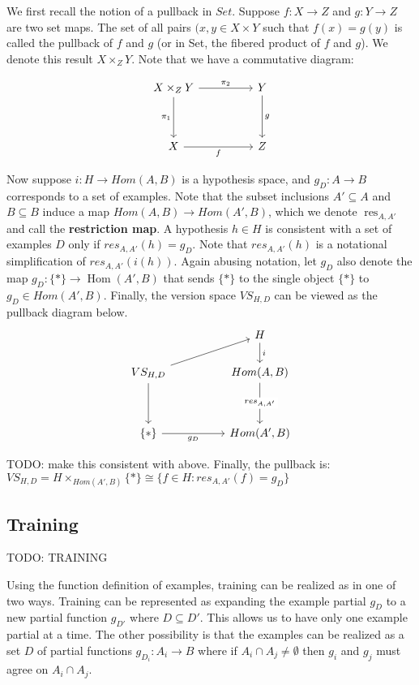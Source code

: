 \documentclass{article}
\theoremstyle{definition}
\begin{document}
We first recall the notion of a pullback in $Set$. Suppose $f:X\rightarrow Z$ and $g:Y\rightarrow Z$ are two set maps. The set of all pairs $(x,y \in X \times Y$ such that $f(x) = g(y)$ is called the pullback of $f$ and $g$ (or in Set, the fibered product of $f$ and $g$). We denote this result $X \times_Z Y$. Note that we have a commutative diagram: 

\[\begin{tikzcd}
	{X\times_Z Y} && Y \\
	\\
	X && Z
	\arrow["{\pi_2}", from=1-1, to=1-3]
	\arrow["{\pi_1}"', from=1-1, to=3-1]
	\arrow["f"', from=3-1, to=3-3]
	\arrow["g", from=1-3, to=3-3]
\end{tikzcd}\]

Now suppose $i:H \rightarrow Hom(A,B)$ is a hypothesis space, and $g_D: A\rightarrow B$ corresponds to a set of examples. Note that the subset inclusions $A' \subseteq A$ and $B \subseteq B$ induce a map $Hom(A,B) \rightarrow Hom(A',B)$, which we denote $\operatorname{res}_{A,A'}$ and call the \textbf{restriction map}. A hypothesis $h \in H$ is consistent with a set of examples $D$ only if $res_{A,A'}(h) = g_D$. Note that $res_{A,A'}(h)$ is a notational simplification of $res_{A,A'}(i(h))$. Again abusing notation, let $g_D$ also denote the map $g_D: \{*\}\rightarrow \operatorname{Hom}(A',B)$ that sends $\{*\}$ to the single object $\{*\}$ to $g_D \in Hom(A', B)$. Finally, the version space $VS_{H,D}$ can be viewed as the pullback diagram below. 
\[\begin{tikzcd}
	&& H \\
	{VS_{H,D}} && {Hom(A,B)} \\
	\\
	\{*\} && {Hom(A', B)}
	\arrow[from=2-1, to=4-1]
	\arrow["{g_D}"', from=4-1, to=4-3]
	\arrow[from=2-1, to=1-3]
	\arrow["{res_{A,A'}}"{description}, from=2-3, to=4-3]
	\arrow["i", from=1-3, to=2-3]
\end{tikzcd}\]

TODO: make this consistent with above. Finally, the pullback is: $VS_{H,D} = H\times_{Hom(A',B)} \{*\} \cong  \{f\in H : res_{A, A'}(f) = g_D\}$ 

\subsection{Training}
TODO: TRAINING

Using the function definition of examples, training can be realized as in one of two ways. Training can be represented as expanding the example partial $g_D$ to a new partial function $g_{D'}$ where $D\subseteq D'$. This allows us to have only one example partial at a time. The other possibility is that the examples can be realized as a set $D$ of partial functions $g_{D_i}: A_i \rightarrow B $ where if $A_i \cap A_j \ne \emptyset$ then $g_i$ and $g_j$ must agree on $A_i \cap A_j$.
\end{document}
